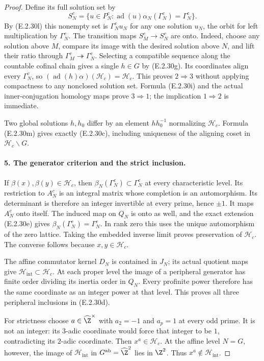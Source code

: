 \begin{proof}
Define its full solution set by
\[
 S_N^c=\{u\in P_N^c:
        \operatorname{ad}(u)\alpha_N(\Gamma_N^c)=\Gamma_N^c\}.
\tag{E.2.30n}
\]
By (E.2.30l) this nonempty set is \(\Gamma_N^c u_N\)
for any one solution \(u_N\), the orbit for left
multiplication by \(\Gamma_N^c\). The transition maps
\(S_M^c\to S_N^c\) are onto. Indeed, choose any solution
above \(M\), compare its image with the desired solution
above \(N\), and lift their ratio through
\(\Gamma_M^c\twoheadrightarrow\Gamma_N^c\).
Selecting a compatible sequence along the countable cofinal
chain gives a single \(h\in G\) by (E.2.30g). Its coordinates
align every \(\Gamma_N^c\), so
\((\operatorname{ad}(h)\alpha)(\mathcal H_c)=\mathcal H_c\).
This proves \(2\Rightarrow3\) without applying compactness
to any nonclosed solution set. Formula (E.2.30i) and the
actual inner-conjugation homology maps prove \(3\Rightarrow1\);
the implication \(1\Rightarrow2\) is immediate.

Two global solutions \(h,h_0\) differ by an element
\(hh_0^{-1}\) normalizing \(\mathcal H_c\). Formula
(E.2.30m) gives exactly (E.2.30c), including uniqueness
of the aligning coset in \(\mathcal H_c\backslash G\).

\paragraph{5. The generator criterion and the strict inclusion.}
If \(\beta(x),\beta(y)\in\mathcal H_c\), then
\(\beta_N(\Gamma_N^c)\subset\Gamma_N^c\) at every
characteristic level. Its restriction to \(A_N^c\) is
an integral matrix whose completion is an automorphism.
Its determinant is therefore an integer invertible at every
prime, hence \(\pm1\). It maps \(A_N^c\) onto itself.
The induced map on \(Q_N\) is onto as well, and the exact
extension (E.2.30e) gives
\(\beta_N(\Gamma_N^c)=\Gamma_N^c\). In rank zero this
uses the unique automorphism of the zero lattice. Taking
the embedded inverse limit proves preservation of
\(\mathcal H_c\). The converse follows because
\(x,y\in\mathcal H_c\).

The affine commutator kernel \(D_N\) is contained in
\(J_N\); its actual quotient maps give
\(\mathcal H_{\mathrm{int}}\subset\mathcal H_c\).
At each proper level the image of a peripheral generator
has finite order dividing its inertia order in \(Q_N\).
Every profinite power therefore has the same coordinate
as an integer power at that level. This proves all three
peripheral inclusions in (E.2.30d).

For strictness choose \(a\in\widehat\Z^{\times}\) with
\(a_2=-1\) and \(a_p=1\) at every odd prime. It is not
an integer: its \(3\)-adic coordinate would force that
integer to be \(1\), contradicting its \(2\)-adic
coordinate. Then \(x^a\in\mathcal H_c\). At the affine
level \(N=G\), however, the image of
\(\mathcal H_{\mathrm{int}}\) in
\(G^{\mathrm{ab}}=\widehat\Z^2\) lies in \(\Z^2\).
Thus \(x^a\notin\mathcal H_{\mathrm{int}}\).


\end{proof}
